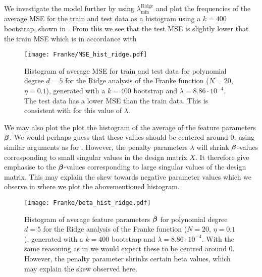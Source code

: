         We investigate the model further by using $\lambda^\mathrm{Ridge}_\mathrm{min}$ and plot the frequencies of the average MSE for the train and test data as a histogram using a $k=400$ bootstrap, shown in . From this we see that the test MSE is slightly lower that the train MSE which is in accordance with 

        \begin{figure}
            \texttt{[image: Franke/MSE\_hist\_ridge.pdf]}
            \caption{Histogram of average MSE for train and test data for polynomial degree $d=5$ for the Ridge analysis of the Franke function ($N=20$, $\eta=0.1$), generated with a $k=400$ bootstrap and $\lambda=8.86\cdot 10^{-4}$. The test data has a lower MSE than the train data. This is consistent with  for this value of $\lambda$.}
            \label{fig:mse_hist_ridge}
        \end{figure}

        We may also plot the plot the histogram of the average of the feature parameters $\boldsymbol{\beta}$. We would perhaps guess that these values should be centered around 0, using similar arguments as for . However, the penalty parameters $\lambda$ will shrink $\boldsymbol{\beta}$-values corresponding to small singular values in the design matrix $X$. It therefore give emphasise to the $\boldsymbol{\beta}$-values corresponding to large singular values of the design matrix. This may explain the skew towards negative parameter values which we observe in  where we plot the abovementioned histogram. 
        \begin{figure}
            \texttt{[image: Franke/beta\_hist\_ridge.pdf]} 
            \caption{Histogram of average feature parameters $\boldsymbol{\beta}$ for polynomial degree $d=5$ for the Ridge analysis of the Franke function ($N=20$, $\eta=0.1$), generated with a $k=400$ bootstrap and $\lambda=8.86\cdot 10^{-4}$. With the same reasoning as in  we would expect these to be centred around 0. However, the penalty parameter shrinks certain beta values, which may explain the skew observed here.}
            \label{fig:beta_hist_ridge}
        \end{figure}












